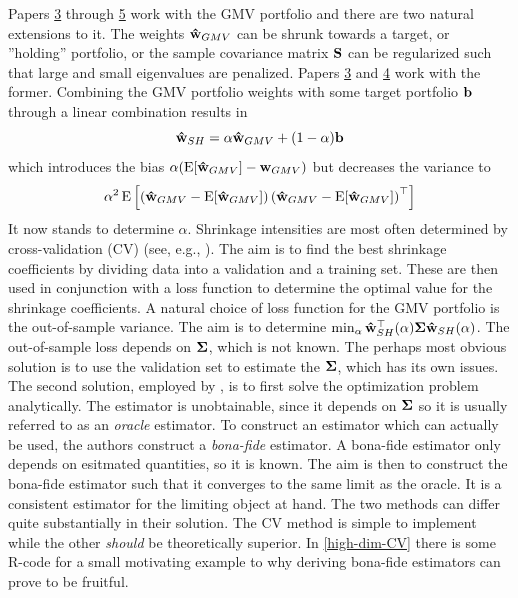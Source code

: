 \documentclass[12pt, oneside]{book}\usepackage{knitr}
\begin{document}
{Papers \hyperref[sec:paper3]{3} through \hyperref[sec:paper4]{5} work with the GMV portfolio and there are two natural extensions to it. 
The weights $\mathbf{\hat{w}}_{GMV}$ can be shrunk towards a target, or ''holding'' portfolio, or the sample covariance matrix $\mathbf{S}$ can be regularized such that large and small eigenvalues are penalized. 
Papers \hyperref[sec:paper3]{3} and \hyperref[sec:paper4]{4} work with the former.
Combining the GMV portfolio weights with some target portfolio $\mathbf{b}$ through a linear combination results in
\begin{equation*}\label{eqn:linshrink}
  \mathbf{\hat{w}}_{SH} = \alpha\mathbf{\hat{w}}_{GMV} + (1-\alpha)\mathbf{b}
\end{equation*}
which introduces the bias $\alpha(\operatorname{E}[\mathbf{\hat{w}}_{GMV}] - \mathbf{w}_{GMV})$ but decreases the variance to
\begin{align*}
  \alpha^2\operatorname{E}\left[\left(\mathbf{\hat{w}}_{GMV} - \operatorname{E}[\mathbf{\hat{w}}_{GMV}]\right)\left(\mathbf{\hat{w}}_{GMV} - \operatorname{E}[\mathbf{\hat{w}}_{GMV}]\right)^\top\right]
\end{align*}
It now stands to determine $\alpha$. 
Shrinkage intensities are most often determined by cross-validation (CV) (see, e.g., \citet[ch. 5]{james2013introduction}). 
The aim is to find the best shrinkage coefficients by dividing data into a validation and a training set.
These are then used in conjunction with a loss function to determine the optimal value for the shrinkage coefficients.
A natural choice of loss function for the GMV portfolio is the out-of-sample variance.
The aim is to determine $\min_\alpha \mathbf{\hat{w}}_{SH}^\top(\alpha) \mathbf{\Sigma} \mathbf{\hat{w}}_{SH}(\alpha)$.
The out-of-sample loss depends on $\mathbf{\Sigma}$, which is not known.
The perhaps most obvious solution is to use the validation set to estimate the $\mathbf{\Sigma}$, which has its own issues.
The second solution, employed by \citet{bodnar2018estimation}, is to first solve the optimization problem analytically.
The estimator is unobtainable, since it depends on $\mathbf{\Sigma}$ so it is usually referred to as an \textit{oracle} estimator. 
To construct an estimator which can actually be used, the authors construct a \textit{bona-fide} estimator.
A bona-fide estimator only depends on esitmated quantities, so it is known.
The aim is then to construct the bona-fide estimator such that it converges to the same limit as the oracle. 
It is a consistent estimator for the limiting object at hand.
The two methods can differ quite substantially in their solution. 
The CV method is simple to implement while the other \textit{should} be theoretically superior.
In \ref{high-dim-CV} there is some R-code for a small motivating example to why deriving bona-fide estimators can prove to be fruitful.
}
\end{document}
